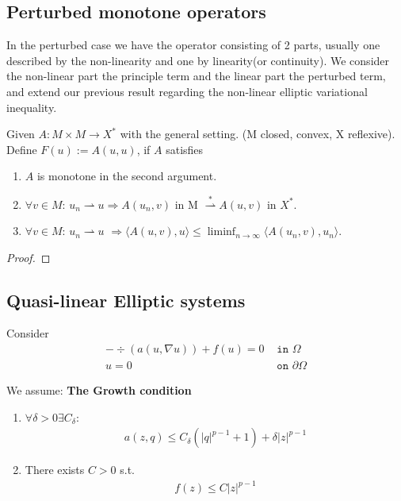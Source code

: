 \subsection{Perturbed monotone operators}
In the perturbed case we have the operator consisting of 2 parts, usually one described by the non-linearity and one by linearity(or continuity). We consider the non-linear part the principle term and the linear part the perturbed term, and extend our previous result regarding the non-linear elliptic variational inequality. 
\begin{theorem}
	Given $A: M \times M \rightarrow X^*$ with the general setting. (M closed, convex, X reflexive). Define $F(u):= A(u, u)$, if $A$ satisfies
	\begin{enumerate}
		\item $A$ is monotone in the second argument.
		\item $\forall v \in M$:  $u_n \rightharpoonup u \Rightarrow A(u_n, v)$ in M $\overset{*}{\rightharpoonup} A(u, v)$ in $X^*$.
		\item $\forall v \in M$: $u_n \rightharpoonup u$ $\Rightarrow \langle A(u, v), u \rangle \le \liminf_{n \rightarrow \infty} \langle A(u_n, v), u_n  \rangle$.   
	\end{enumerate}
\end{theorem}
\begin{proof}
\end{proof}


\subsection{Quasi-linear Elliptic systems}
Consider
\begin{align*}
	- \div (a(u, \nabla u) ) + f(u) = 0 & \texttt{ in } \Omega\\
	u = 0 & \texttt{ on } \partial \Omega 
\end{align*}

We assume:
\textbf{The Growth condition}
\begin{enumerate}
	\item $\forall \delta > 0 \exists C_\delta$:
	\begin{align*}
		a(z, q) \le C_\delta (|q|^{p -1} + 1) + \delta |z|^{p -1}
	\end{align*}
	\item There exists $C > 0$ s.t.
	\begin{align*}
		f(z) \le C |z|^{p - 1}
	\end{align*}
\end{enumerate}




